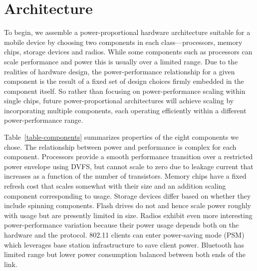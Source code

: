 \section{Architecture}
\label{section-architecture}



To begin, we assemble a power-proportional hardware architecture suitable for
a mobile device by choosing two components in each class---processors,
memory chips, storage devices and radios. While some components such as
processors can scale performance and power this is usually over a limited
range. Due to the realities of hardware design, the power-performance
relationship for a given component is the result of a fixed set of design
choices firmly embedded in the component itself. So rather than focusing on
power-performance scaling within single chips, future power-proportional
architectures will achieve scaling by incorporating multiple components, each
operating efficiently within a different power-performance range.

Table~\ref{table-components} summarizes properties of the eight components we
chose. The relationship between power and performance is complex for each
component. Processors provide a smooth performance transition over a
restricted power envelope using DVFS, but cannot scale to zero due to leakage
current that increases as a function of the number of transistors. Memory
chips have a fixed refresh cost that scales somewhat with their size and an
addition scaling component corresponding to usage. Storage devices differ
based on whether they include spinning components. Flash drives do not and
hence scale power roughly with usage but are presently limited in size.
Radios exhibit even more interesting power-performance variation because
their power usage depends both on the hardware and the protocol. 802.11
clients can enter power-saving mode (PSM) which leverages base station
infrastructure to save client power. Bluetooth has limited range but lower
power consumption balanced between both ends of the link.

